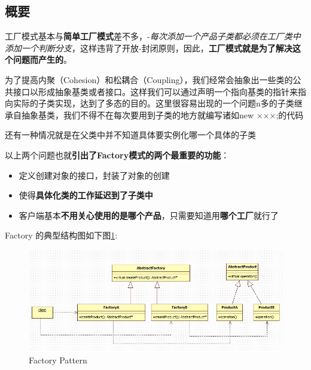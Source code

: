 \documentclass[UTF8,a4paper,12pt]{ctexbook}
\begin{document}
	\subsection{概要}
		工厂模式基本与\textbf{简单工厂模式}差不多，-\textit{每次添加一个产品子类都必须在工厂类中添加一个判断分支}，这样违背了开放-封闭原则，因此，\textbf{工厂模式就是为了解决这个问题而产生的}。
		
		为了提高内聚（Cohesion）和松耦合（Coupling），我们经常会抽象出一些类的公共接口以形成抽象基类或者接口。这样我们可以通过声明一个指向基类的指针来指向实际的子类实现，达到了多态的目的。这里很容易出现的一个问题n多的子类继承自抽象基类，我们不得不在每次要用到子类的地方就编写诸如new ×××;的代码

		还有一种情况就是在父类中并不知道具体要实例化哪一个具体的子类
		
		以上两个问题也就\textbf{引出了Factory模式的两个最重要的功能}：
			\begin{itemize}[itemindent = 1em]
				\item 定义创建对象的接口，封装了对象的创建
				
				\item 使得\textbf{具体化类的工作延迟到了子类中}
				
				\item 客户端基本\textbf{不用关心使用的是哪个产品}，只需要知道用\textbf{哪个工厂}就行了
			\end{itemize}
			
		Factory 的典型结构图如下图\ref{Factory}:
		\begin{figure}[h]
			\centering
			\includegraphics[width = 14cm]{Factory.jpg}
			\caption{Factory Pattern}
			\label{Factory}
		\end{figure}
\end{document}
